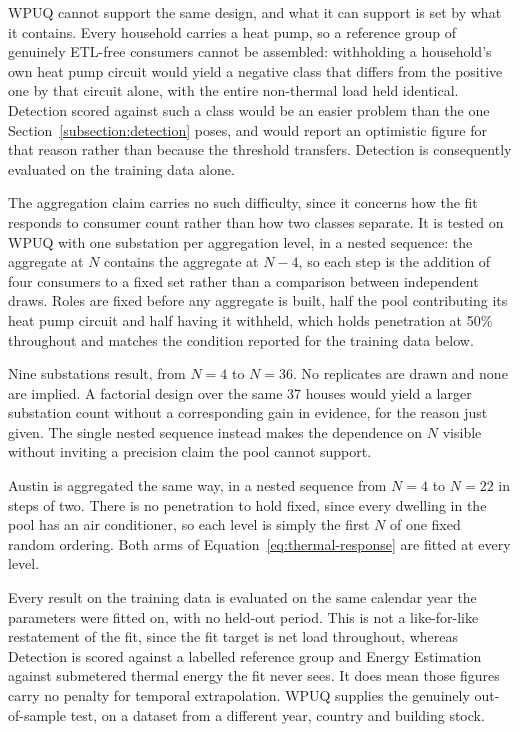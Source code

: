 \documentclass[9pt,journal,a4]{IEEEtran}
\begin{document}
WPUQ cannot support the same design, and what it can support is set by what it contains. Every household carries a heat pump, so a reference group of genuinely ETL-free consumers cannot be assembled: withholding a household's own heat pump circuit would yield a negative class that differs from the positive one by that circuit alone, with the entire non-thermal load held identical. Detection scored against such a class would be an easier problem than the one Section~\ref{subsection:detection} poses, and would report an optimistic figure for that reason rather than because the threshold transfers. Detection is consequently evaluated on the training data alone.

The aggregation claim carries no such difficulty, since it concerns how the fit responds to consumer count rather than how two classes separate. It is tested on WPUQ with one substation per aggregation level, in a nested sequence: the aggregate at $N$ contains the aggregate at $N-4$, so each step is the addition of four consumers to a fixed set rather than a comparison between independent draws. Roles are fixed before any aggregate is built, half the pool contributing its heat pump circuit and half having it withheld, which holds penetration at 50\% throughout and matches the condition reported for the training data below.

Nine substations result, from $N = 4$ to $N = 36$. No replicates are drawn and none are implied. A factorial design over the same 37 houses would yield a larger substation count without a corresponding gain in evidence, for the reason just given. The single nested sequence instead makes the dependence on $N$ visible without inviting a precision claim the pool cannot support.

Austin is aggregated the same way, in a nested sequence from $N = 4$ to $N = 22$ in steps of two. There is no penetration to hold fixed, since every dwelling in the pool has an air conditioner, so each level is simply the first $N$ of one fixed random ordering. Both arms of Equation~\eqref{eq:thermal-response} are fitted at every level.

Every result on the training data is evaluated on the same calendar year the parameters were fitted on, with no held-out period. This is not a like-for-like restatement of the fit, since the fit target is net load throughout, whereas Detection is scored against a labelled reference group and Energy Estimation against submetered thermal energy the fit never sees. It does mean those figures carry no penalty for temporal extrapolation. WPUQ supplies the genuinely out-of-sample test, on a dataset from a different year, country and building stock.
\end{document}
